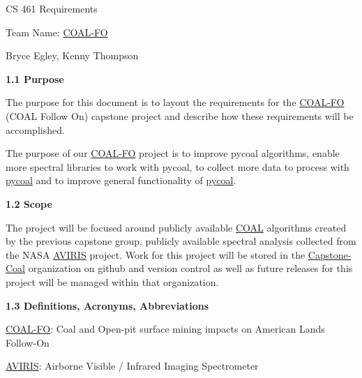 \documentclass[a4paper,12pt]{article}
\begin{document}
\sloppy

\noindent CS 461 Requirements\newline


\noindent Team Name: \href{https://capstone-coal.github.io/team}{COAL-FO}\newline


\noindent Bryce Egley, Kenny Thompson\newline


\newline


\noindent \textbf{1.1 Purpose}\newline


\noindent The purpose for this document is to layout the requirements for the \href{https://capstone-coal.github.io/team}{COAL-FO} (COAL Follow On) capstone project and describe how these requirements will be accomplished. \newline

\noindent The purpose of our \href{https://capstone-coal.github.io/team}{COAL-FO} project is to improve pycoal algorithms, enable more spectral libraries to work with pycoal, to collect more data to process with \href{https://github.com/capstone-coal/pycoal}{pycoal} and to improve general functionality of \href{https://github.com/capstone-coal/pycoal}{pycoal}. \newline

\noindent \textbf{1.2 Scope}\newline


\noindent The project will be focused around publicly available \href{https://capstone-coal.github.io/}{COAL} algorithms created by the previous capstone group, publicly available spectral analysis collected from the NASA \href{https://aviris.jpl.nasa.gov/}{AVIRIS} project. Work for this project will be stored in the \href{https://github.com/capstone-coal}{Capstone-Coal} organization on github and version control as well as future releases for this project will be managed within that organization.\newline


\noindent \textbf{1.3 Definitions, Acronyms, Abbreviations}\newline


\noindent \href{https://capstone-coal.github.io/team}{COAL-FO}: Coal and Open-pit surface mining impacts on American Lands Follow-On\newline

\noindent \href{https://aviris.jpl.nasa.gov/}{AVIRIS}: Airborne Visible / Infrared Imaging Spectrometer\newline
\end{document}
